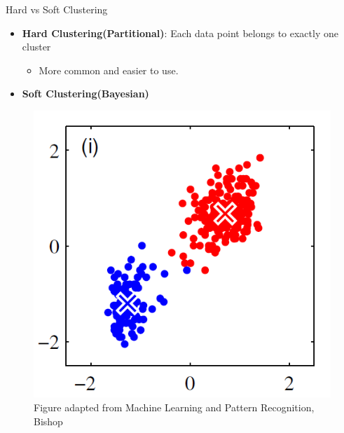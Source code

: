 \documentclass[serif, aspectratio=169]{beamer}
\begin{document}
\begin{frame}{Hard vs Soft Clustering}
    \begin{minipage}{0.55\textwidth}
        \begin{itemize}
        \item \textbf{Hard Clustering(Partitional)}: Each data point belongs to exactly one cluster
        \begin{itemize}
            \item More common and easier to use.
        \end{itemize}
        \item \textbf{Soft Clustering(Bayesian)}
    \end{itemize}
    \end{minipage}%
    \begin{minipage}{0.40\textwidth}
        \begin{figure}
            \centering
            \includegraphics[scale=0.5]{pic/hard_clustering.png}
            {\scriptsize Figure adapted from Machine Learning and Pattern Recognition, Bishop}
        \end{figure}
    \end{minipage}
    
\end{frame}
\end{document}
